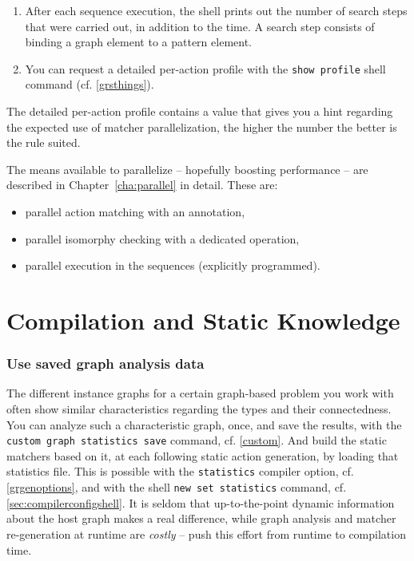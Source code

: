\begin{enumerate}
	\item After each sequence execution, the shell prints out the number of search steps that were carried out, in addition to the time. 
		A search step consists of binding a graph element to a pattern element.
	\item You can request a detailed per-action profile with the \texttt{show profile} shell command (cf. \ref{grsthings}).
\end{enumerate}

The detailed per-action profile contains a value that gives you a hint regarding the expected use of matcher parallelization, the higher the number the better is the rule suited.

The means available to parallelize -- hopefully boosting performance -- are described in Chapter~\ref{cha:parallel} in detail.
These are:
\begin{itemize}
	\item parallel action matching with an annotation,
	\item parallel isomorphy checking with a dedicated operation,
	\item parallel execution in the sequences (explicitly programmed).
\end{itemize}

\pagebreak

\section{Compilation and Static Knowledge}

\subsubsection*{Use saved graph analysis data}
The different instance graphs for a certain graph-based problem you work with often show similar characteristics regarding the types and their connectedness.
You can analyze such a characteristic graph, once, and save the results,
with the \texttt{custom graph statistics save} command, cf. \ref{custom}.
And build the static matchers based on it, at each following static action generation, by loading that statistics file. 
This is possible with the \texttt{statistics} compiler option, cf. \ref{grgenoptions},
and with the shell \texttt{new set statistics} command, cf. \ref{sec:compilerconfigshell}. 
It is seldom that up-to-the-point dynamic information about the host graph makes a real difference,
while graph analysis and matcher re-generation at runtime are \emph{costly} -- push this effort from runtime to compilation time.

